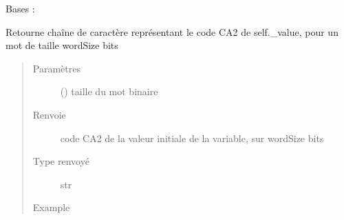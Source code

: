 \documentclass[letterpaper,10pt,french]{sphinxmanual}
\begin{document}
\begin{fulllineitems}
\label{\detokenize{variable:variable.Variable}}
Bases : 

\begin{fulllineitems}
\label{\detokenize{variable:variable.Variable.getValueBinary}}
Retourne chaîne de caractère représentant le code CA2 de self.\_value,
pour un mot de taille wordSize bits
\begin{quote}\begin{description}
\item[{Paramètres}] \leavevmode
{} () \textendash{} taille du mot binaire

\item[{Renvoie}] \leavevmode
code CA2 de la valeur initiale de la variable, sur wordSize bits

\item[{Type renvoyé}] \leavevmode
str

\item[{Example}] \leavevmode
\begin{sphinxVerbatim}[commandchars=\\\{\}]
\end{sphinxVerbatim}

\begin{sphinxVerbatim}[commandchars=\\\{\}]
\end{sphinxVerbatim}


\end{description}
\end{quote}
\end{fulllineitems}
\end{fulllineitems}
\end{document}
